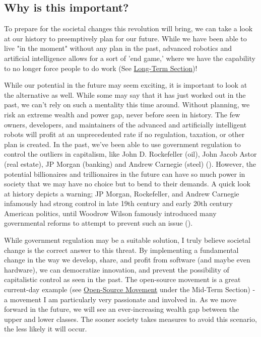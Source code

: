 \subsection{Why is this important?}

To prepare for the societal changes this revolution will bring, we can take a look at our history to preemptively plan for our future. While we have been able to live "in the moment" without any plan in the past, advanced robotics and artificial intelligence allows for a sort of 'end game,' where we have the capability to no longer force people to do work (See \hyperref[sec:long]{Long-Term Section})!

While our potential in the future may seem exciting, it is important to look at the alternative as well. While some may say that it has just worked out in the past, we can't rely on such a mentality this time around. Without planning, we risk an extreme wealth and power gap, never before seen in history. The few owners, developers, and maintainers of the advanced and artificially intelligent robots will profit at an unprecedented rate if no regulation, taxation, or other plan is created. In the past, we've been able to use government regulation to control the outliers in capitalism, like John D. Rockefeller (oil), John Jacob Astor (real estate), JP Morgan (banking) and Andrew Carnegie (steel) (\cite{CapitalistAmerica}). However, the potential billionaires and trillionaires in the future can have so much power in society that we may have no choice but to bend to their demands. A quick look at history depicts a warning; JP Morgan, Rockefeller, and Andrew Carnegie infamously had strong control in late 19th century and early 20th century American politics, until Woodrow Wilson famously introduced many governmental reforms to attempt to prevent such an issue (\cite{CapitalismSocialismDemocracy}).

While government regulation may be a suitable solution, I truly believe societal change is the correct answer to this threat. By implementing a fundamental change in the way we develop, share, and profit from software (and maybe even hardware), we can democratize innovation, and prevent the possibility of capitalistic control as seen in the past. The open-source movement is a great current-day example (see \hyperref[subsec:open-source]{Open-Source Movement} under the Mid-Term Section) - a movement I am particularly very passionate and involved in. As we move forward in the future, we will see an ever-increasing wealth gap between the upper and lower classes. The sooner society takes measures to avoid this scenario, the less likely it will occur.

